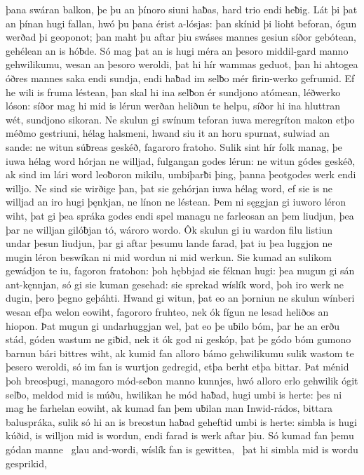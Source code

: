 þana swáran balkon, þe þu an þínoro siuni haƀas,
hard trio endi heƀig. Lát þi þat an þínan hugi fallan,
hwó þu þana érist a-lósjas: þan skínid þi lioht beforan,
ógun werðad þi geoponot; þan maht þu aftar þiu
swáses mannes gesiun síðor gebótean,
gehélean an is hóƀde. Só mag þat an is hugi méra
an þesoro middil-gard manno gehwilikumu,
wesan an þesoro weroldi, þat hi hír wammas geduot,
þan hi ahtogea óðres mannes
saka endi sundja, endi haƀad im selƀo mér
firin-werko gefrumid. Ef he wili is fruma léstean,
þan skal hi ina selƀon ér sundjono atómean,
léðwerko lóson: síðor mag hi mid is lérun werðan
heliðun te helpu, síðor hi ina hluttran wét,
sundjono sikoran. Ne skulun gi swínum teforan
iuwa meregríton makon etþo méðmo gestriuni,
hélag halsmeni, hwand siu it an horu spurnat,
sulwiad an sande: ne witun súƀreas geskéð,
fagaroro fratoho. Sulik sint hír folk manag,
þe iuwa hélag word hórjan ne willjad,
fulgangan godes lérun: ne witun gódes geskéð,
ak sind im lári word leoƀoron mikilu,
umbiþarƀi þing, þanna þeotgodes
werk endi willjo. Ne sind sie wirðige þan,
þat sie gehórjan iuwa hélag word, ef sie is ne willjad an iro hugi þęnkjan,
ne línon ne léstean. Þem ni sęggjan gi iuworo léron wiht,
þat gi þea spráka godes endi spel managu
ne farleosan an þem liudjun, þea þar ne willjan gilóƀjan tó,
wároro wordo. Ôk skulun gi iu wardon filu
listiun undar þesun liudjun, þar gi aftar þesumu lande farad,
þat iu þea luggjon ne mugin léron beswíkan
ni mid wordun ni mid werkun. Sie kumad an sulikom gewádjon te iu,
fagoron fratohon: þoh hębbjad sie féknan hugi:
þea mugun gi sán ant-kęnnjan, só gi sie kuman gesehad:
sie sprekad wíslík word, þoh iro werk ne dugin,
þero þegno geþáhti. Hwand gi witun, þat eo an þorniun ne skulun
wínberi wesan efþa welon eowiht,
fagororo fruhteo, nek ók fígun ne lesad
heliðos an hiopon. Þat mugun gi undarhuggjan wel,
þat eo þe uƀilo bóm, þar he an erðu stád,
góden wastum ne giƀid, nek it ók god ni geskóp,
þat þe gódo bóm gumono barnun
bári bittres wiht, ak kumid fan alloro bámo gehwilikumu
sulik wastom te þesero weroldi, só im fan is wurtjon gedregid,
etþa berht etþa bittar. Þat ménid þoh breosþugi,
managoro mód-seƀon manno kunnjes,
hwó alloro erlo gehwilik ógit selƀo,
meldod mid is múðu, hwilikan he mód haƀad,
hugi umbi is herte: þes ni mag he farhelan eowiht,
ak kumad fan þem uƀilan man Inwid-rádos,
bittara baluspráka, sulik só hi an is breostun haƀad
geheftid umbi is herte: simbla is hugi kúðid,
is willjon mid is wordun, endi farad is werk aftar þiu.
Só kumad fan þemu gódan manne \hld\ glau and-wordi,
wíslík fan is gewittea, \hld\ þat hi simbla mid is wordu gesprikid,

